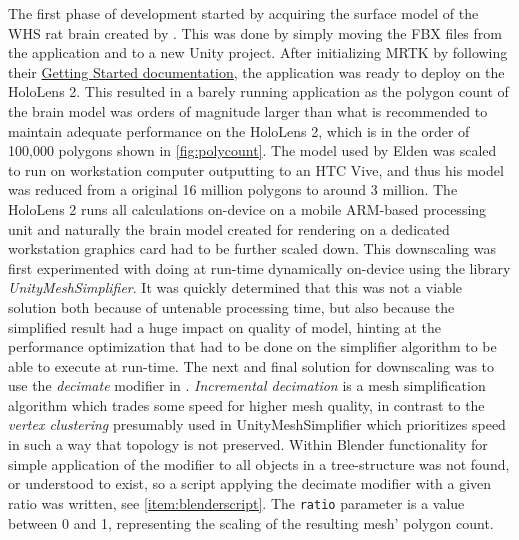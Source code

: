 The first phase of development started by acquiring the surface model of the WHS rat brain created by \citet{Elden2017}. This was done by simply moving the FBX files from the  application and to a new Unity project. After initializing MRTK by following their \href{https://microsoft.github.io/MixedRealityToolkit-Unity/version/releases/2.2.0/Documentation/GettingStartedWithTheMRTK.html}{Getting Started documentation}, the application was ready to deploy on the HoloLens 2. This resulted in a barely running application as the polygon count of the brain model was orders of magnitude larger than what is recommended to maintain adequate performance on the HoloLens 2, which is in the order of 100,000 polygons shown in \autoref{fig:polycount}. The model used by Elden was scaled to run on workstation computer outputting to an HTC Vive, and thus his model was reduced from a original 16 million polygons to around 3 million. The HoloLens 2 runs all calculations on-device on a mobile ARM-based processing unit and naturally the brain model created for rendering on a dedicated workstation graphics card had to be further scaled down. 
This downscaling was first experimented with doing at run-time dynamically on-device using the library \textit{UnityMeshSimplifier}. It was quickly determined that this was not a viable solution both because of untenable processing time, but also because the simplified result had a huge impact on quality of model, hinting at the performance optimization that had to be done on the simplifier algorithm to be able to execute at run-time. The next and final solution for downscaling was to use the \textit{decimate} modifier in . \textit{Incremental decimation} is a mesh simplification algorithm which trades some speed for higher mesh quality, in contrast to the \textit{vertex clustering} presumably used in UnityMeshSimplifier which prioritizes speed in such a way that topology is not preserved. Within Blender functionality for simple application of the modifier to all objects in a tree-structure was not found, or understood to exist, so a script applying the decimate modifier with a given ratio was written, see \autoref{item:blenderscript}. The \texttt{ratio} parameter is a value between 0 and 1, representing the scaling of the resulting mesh' polygon count.

